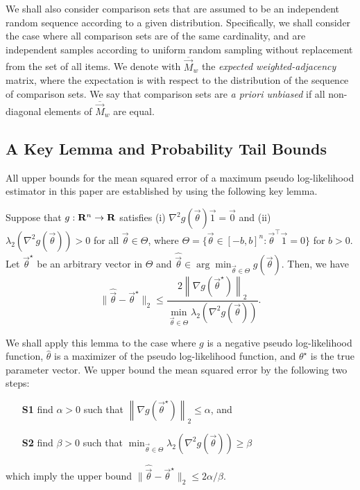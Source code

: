 We shall also consider comparison sets that are assumed to be an independent random sequence according to a given distribution. Specifically, we shall consider the case where all comparison sets are of the same cardinality, and are independent samples according to uniform random sampling without replacement from the set of all items. We denote with $\overline{\vec{M}}_w$ the \emph{expected weighted-adjacency} matrix, where the expectation is with respect to the distribution of the sequence of comparison sets. We say that comparison sets are \emph{a priori unbiased} if all non-diagonal elements of $\overline{\vec{M}}_w$ are equal.  

\subsection{A Key Lemma and Probability Tail Bounds}

All upper bounds for the mean squared error of a maximum pseudo log-likelihood estimator in this paper are established by using the following key lemma.

\begin{lemma} Suppose that $g:\mathbf{R}^n \rightarrow \mathbf{R}$ satisfies (i) $\nabla^2 g(\vec{\theta})\vec{1} = \vec{0}$ and (ii) $\lambda_2(\nabla^2g(\vec{\theta}))>0$ for all $\vec{\theta} \in \Theta$, where $\Theta = \{\vec{\theta}\in [-b,b]^n: \vec{\theta}^\top \vec{1} = 0\}$ for $b > 0$. Let $\vec{\theta}^\star$ be an arbitrary vector in $\Theta$ and $\widehat{\vec{\theta}}\in \arg\min_{\vec{\theta}\in \Theta} g(\vec{\theta})$. Then, we have
$$
\|\widehat{\vec{\theta}} -\vec{\theta}^\star \|_2 \le 
\frac{2\left\|\nabla g(\vec{\theta}^\star) \right\|_2}{\min_{\vec{\theta}\in \Theta}\lambda_2(\nabla^2 g(\vec{\theta}))}.
$$
\label{lem:mle-taylor}
\end{lemma}

We shall apply this lemma to the case where $g$ is a negative pseudo log-likelihood function, $\widehat{\theta}$ is a maximizer of the pseudo log-likelihood function, and $\theta^\star$ is the true parameter vector. We upper bound the mean squared error by the following two steps: 
\begin{itemize}
\item[{\bf S1}] find $\alpha > 0$ such that $\left\|\nabla g(\vec{\theta}^\star) \right\|_2 \leq \alpha$, and 
\item[{\bf S2}] find $\beta > 0$ such that $\min_{\vec{\theta}\in \Theta}\lambda_2(\nabla^2 g(\vec{\theta})) \geq \beta$
\end{itemize}
which imply the upper bound $\|\widehat{\vec{\theta}} -\vec{\theta}^\star \|_2 \leq 2\alpha / \beta$. 

